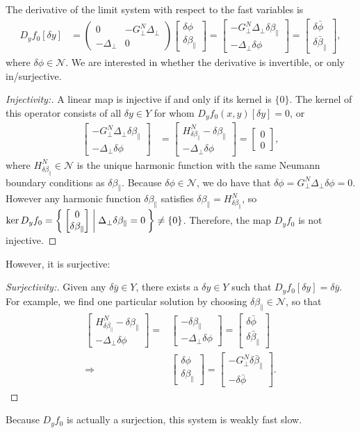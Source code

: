 \documentclass{article}
\newcommand{\para}{\parallel}
\newcommand{\lap}{\Delta_\perp}
\newcommand{\GN}{G_\perp^N}
\newcommand{\bmat} [1] {\begin{bmatrix} #1 \end{bmatrix}}
\newcommand{\pmat} [1] {\begin{pmatrix} #1 \end{pmatrix}}
\begin{document}
The derivative of the limit system with respect to the fast variables is 
\begin{align}
    D_yf_0[\delta y] &= \pmat{0 & -\GN\lap \\ -\lap & 0} \bmat{\delta\phi \\ \delta\beta_\para} = \bmat{-\GN\lap\delta\beta_\para \\ -\lap\delta\phi} = \bmat{\delta\bar{\phi} \\ \delta\bar{\beta}_\para}, 
\end{align}
where $\delta\phi \in\mathcal{N}$. We are interested in whether the derivative is invertible, or only in/surjective. 
\begin{proof} [Injectivity:]
    A linear map is injective if and only if its kernel is $\{0\}$. The kernel of this operator consists of all $\delta y\in Y$ for whom $D_yf_0(x,y)[\delta y] = 0$, or 
    \begin{align}
    \bmat{-\GN\lap\delta\beta_\para \\ -\lap\delta\phi} &= 
    \bmat{H^N_{\delta\beta_\para} - \delta\beta_\para \\ -\lap\delta\phi} = 
    \bmat{0 \\ 0},
    \end{align}
    where $H^N_{\delta\beta_\para}\in\mathcal{N}$ is the unique harmonic function with the same Neumann boundary conditions as $\delta\beta_\para$. Because $\delta\phi\in\mathcal{N}$, we do have that $\delta\phi = \GN\lap\delta\phi = 0$. However any harmonic function $\delta\beta_\para$ satisfies $\delta\beta_\para = H^N_{\delta\beta_\para}$, so $\ker D_yf_0 = \Set{ \bmat{0 \\ \delta\beta_\para} | \lap \delta\beta_\para=0} \neq \{0\}$. Therefore, the map $D_yf_0$ is not injective. 
\end{proof}
However, it is surjective:
\begin{proof} [Surjectivity:]
    Given any $\delta\bar{y} \in Y$, there exists a $\delta y\in Y$ such that $D_yf_0[\delta y] = \delta\bar{y}$. For example, we find one particular solution by choosing $\delta\beta_\para\in\mathcal{N}$, so that  
    \begin{align}
    \bmat{H^N_{\delta\beta_\para} - \delta\beta_\para \\ -\lap\delta\phi} =& \bmat{-\delta\beta_\para \\ -\lap\delta\phi} =  \bmat{\delta\bar{\phi} \\ \delta\bar{\beta}_\para} \\ 
    \Longrightarrow & \bmat{\delta\phi \\ \delta\beta_\para} = \bmat{-\GN \delta\bar{\beta}_\para \\ -\delta\bar{\phi}}. 
    \end{align}
\end{proof}
Because $D_yf_0$ is actually a surjection, this system is weakly fast slow.
\end{document}
